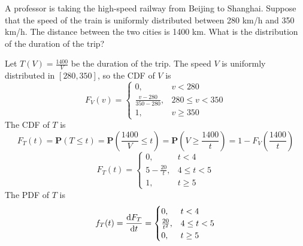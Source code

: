 \begin{example}
    A professor is taking the high-speed railway from Beijing to Shanghai. Suppose that the speed of the train is uniformly distributed between 280 km/h and 350 km/h. The distance between the two cities is 1400 km. What is the distribution of the duration of the trip?
\end{example}
\begin{solution}
    Let $T(V) = \frac{1400}{V}$ be the duration of the trip. The speed $V$ is uniformly distributed in $[280, 350]$, so the CDF of $V$ is
    \begin{equation}
        F_{V}(v) = \begin{cases}
            0, & v < 280 \\ 
            \frac{v - 280}{350 - 280}, & 280 \leq v < 350 \\ 
            1, & v \geq 350
        \end{cases}
    \end{equation}
    The CDF of $T$ is
    \begin{equation}
        F_{T}(t) = \mathbf{P}(T \leq t) = \mathbf{P}\left(\frac{1400}{V} \leq t\right) = \mathbf{P}\left(V \geq \frac{1400}{t}\right) = 1 - F_{V}\left(\frac{1400}{t}\right)
    \end{equation}
    \begin{equation}
        F_{T}(t) = \begin{cases}
            0, & t < 4 \\ 
            5 - \frac{20}{t}, & 4 \leq t < 5 \\ 
            1, & t \geq 5
        \end{cases}
    \end{equation}
    The PDF of $T$ is
    \begin{equation}
        f_{T}(t) = \dv{F_{T}}{t} = \begin{cases}
            0, & t < 4 \\ 
            \frac{20}{t^2}, & 4 \leq t < 5 \\ 
            0, & t \geq 5
        \end{cases}
    \end{equation}
\end{solution}

